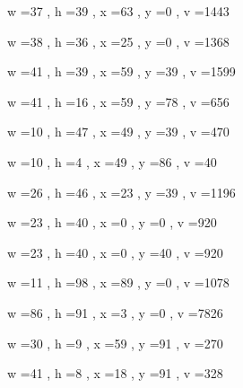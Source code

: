 \documentclass[11pt]{article}
\begin{document}
w =37 , h =39 , x =63 , y =0 , v =1443
\par
w =38 , h =36 , x =25 , y =0 , v =1368
\par
w =41 , h =39 , x =59 , y =39 , v =1599
\par
w =41 , h =16 , x =59 , y =78 , v =656
\par
w =10 , h =47 , x =49 , y =39 , v =470
\par
w =10 , h =4 , x =49 , y =86 , v =40
\par
w =26 , h =46 , x =23 , y =39 , v =1196
\par
w =23 , h =40 , x =0 , y =0 , v =920
\par
w =23 , h =40 , x =0 , y =40 , v =920
\par
\newpage




w =11 , h =98 , x =89 , y =0 , v =1078
\par
w =86 , h =91 , x =3 , y =0 , v =7826
\par
w =30 , h =9 , x =59 , y =91 , v =270
\par
w =41 , h =8 , x =18 , y =91 , v =328
\par
\newpage
\end{document}

